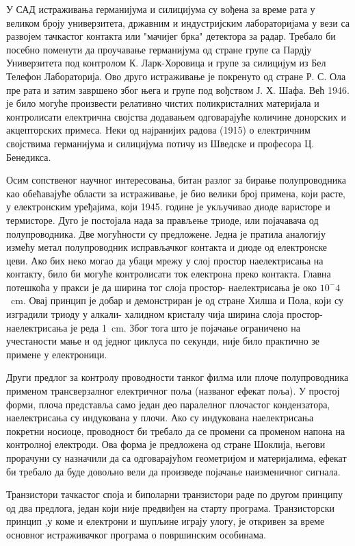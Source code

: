 \documentclass{article}
\begin{document}
У САД истраживања германијума и силицијума су вођена за време рата у великом броју универзитета, државним и индустријским лабораторијама у вези са развојем тачкастог контакта или "мачијег брка" детектора за радар. Требало би посебно поменути да проучавање германијума од стране групе са Пардју Универзитета под контролом  К. Ларк-Хоровица и групе за силицијум из Бел Телефон Лабораторија. Ово друго истраживање је покренуто од стране Р. С. Ола пре рата и затим завршено због њега и групе под вођством Ј. Х. Шафа. Већ 1946. је било могуће произвести релативно чистих поликристалних материјала и контролисати електрична својства додавањем одговарајуће количине донорских и акцепторских примеса. Неки од најранијих радова (1915) о електричним својствима германијума и силицијума потичу из Шведске и професора Ц. Бенедикса.

Осим сопственог научног интересовања, битан разлог за бирање полупроводника као обећавајуће области за истраживање, је био велики број примена, који расте, у електронским уређајима, који 1945. године је укључивао диоде варисторе и термисторе. Дуго је постојала нада за прављење триоде, или појачавача од полупроводника. Две могућности су предложене. Једна је пратила аналогију измећу метал полупроводник исправљачког контакта и диоде од електронске цеви. Ако бих неко могао да убаци мрежу у слој простор наелектрисања на контакту, било би могуће контролисати ток електрона преко контакта. Главна потешкоћа у пракси је да ширина тог слоја простор- наелектрисања је око $10^-4$ \SI{}{\centi\meter}. Овај принцип је добар и демонстриран је од стране Хилша и Пола, који су изградили триоду у алкали- халидном кристалу чија ширина слоја простор- наелектрисања је реда \SI{1}{\centi\meter}. Због тога што је појачање ограничено на учестаности мање и од једног циклуса по секунди, није било практично зе примене у електроници.

Други предлог за контролу проводности танког филма или плоче полупроводника применом трансверзалног електричног поља (названог ефекат поља). У простој форми, плоча представља само један део паралелног плочастог кондензатора, наелектрисања су индукована у плочи. Ако су индукована наелектрисања покретни носиоце, проводност би требало да се промени са променом напона на контролној електроди. Ова форма је предложена од стране Шоклија, његови прорачуни су назначили да са одговарајућом геометријом и материјалима, ефекат би требало да буде довољно вели да произведе појачање наизменичног сигнала.

Транзистори тачкастог споја и биполарни транзистори раде по другом принципу од два предлога, један који није предвиђен на старту програма. Транзисторски принцип ,у коме и електрони и шупљине играју улогу, је откривен за време основног истраживачког програма о површинским особинама.
\end{document}
